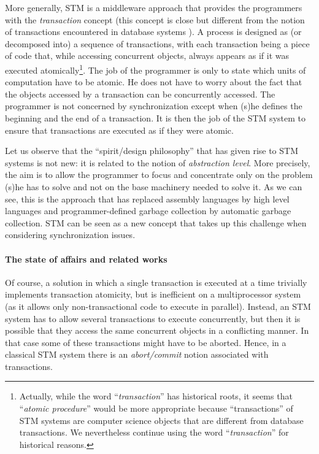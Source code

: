 More generally,  STM  is a middleware approach that provides the 
programmers  with the {\it transaction} concept (this concept 
is close but different from the notion of transactions encountered in 
database systems \cite{FFGH08}). A process is designed as 
(or decomposed into)  a sequence of transactions, with each transaction 
being a piece  of code that, while  accessing  concurrent  objects, 
always  appears as if it was  executed atomically\footnote{Actually,  
while the word {``\it transaction}'' has historical roots, it seems that 
{``\it atomic procedure}'' would be more appropriate because 
``transactions''  of STM systems are  computer science objects 
that are different  from database transactions.  We nevertheless 
continue using the word  {``\it transaction}'' for historical reasons.}.
The job of the programmer is only to state which  units of computation
have  to be atomic.  He does not have to worry about the fact that the 
objects accessed by  a transaction can be concurrently accessed. 
The programmer is not concerned by synchronization
except when (s)he defines the beginning and the end of a  transaction.
It  is then the job of the 
STM system to ensure that transactions are executed as if they were atomic. 



Let us observe that  the ``spirit/design philosophy'' that has given 
rise to  STM systems is not new: it is related to the notion of 
{\it abstraction level}.   
More precisely,  the  aim  is   to allow  the programmer  to  focus and
concentrate only  on the problem  (s)he has to
solve and not on the base machinery needed to solve it. 
As we can see, this is the approach  that  has   replaced assembly languages  
by  high level languages and programmer-defined garbage collection 
by automatic garbage collection.   STM can  be seen as a  new concept
that takes  up  this challenge when considering synchronization issues. 


\paragraph{The state of affairs and  related works}
Of course, a solution in which a single transaction is executed at a time 
trivially implements transaction atomicity, but is inefficient
on a multiprocessor system (as it allows only non-transactional code 
 to execute in parallel).   Instead, an STM system has to allow 
several transactions to execute  concurrently, but then it is possible that
they access the same concurrent objects in a conflicting manner.
In that case
some  of  these  transactions might  have  to   be  aborted. Hence,  in  a
classical  STM system    there    is  an    {\it   abort/commit}    notion
associated   with transactions. 
























